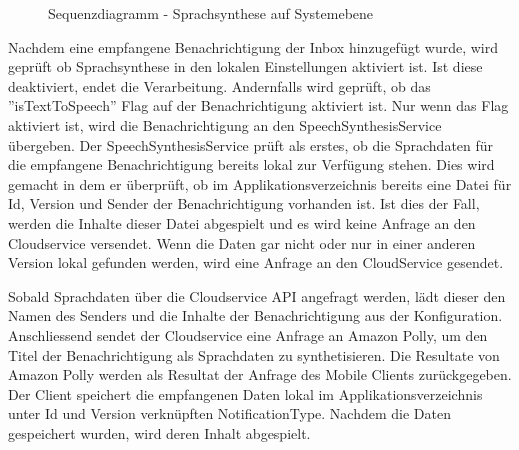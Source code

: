 \begin{figure}[h]
    \centering
    \begin{minipage}[b]{1\textwidth}
        \caption{Sequenzdiagramm - Sprachsynthese auf Systemebene}
    \end{minipage}
\end{figure}


Nachdem eine empfangene Benachrichtigung der Inbox hinzugefügt wurde, wird geprüft ob Sprachsynthese in den lokalen Einstellungen aktiviert ist.
Ist diese deaktiviert, endet die Verarbeitung.
Andernfalls wird geprüft, ob das ''isTextToSpeech'' Flag auf der Benachrichtigung aktiviert ist.
Nur wenn das Flag aktiviert ist, wird die Benachrichtigung an den SpeechSynthesisService übergeben.
Der SpeechSynthesisService prüft als erstes, ob die Sprachdaten für die empfangene Benachrichtigung bereits lokal zur Verfügung stehen.
Dies wird gemacht in dem er überprüft, ob im Applikationsverzeichnis bereits eine Datei für Id, Version und Sender der Benachrichtigung vorhanden ist.
Ist dies der Fall, werden die Inhalte dieser Datei abgespielt und es wird keine Anfrage an den Cloudservice versendet.
Wenn die Daten gar nicht oder nur in einer anderen Version lokal gefunden werden, wird eine Anfrage an den CloudService gesendet.

Sobald Sprachdaten über die Cloudservice API angefragt werden, lädt dieser den Namen des Senders und die Inhalte der Benachrichtigung aus der Konfiguration.
Anschliessend sendet der Cloudservice eine Anfrage an Amazon Polly, um den Titel der Benachrichtigung als Sprachdaten zu synthetisieren.
Die Resultate von Amazon Polly werden als Resultat der Anfrage des Mobile Clients zurückgegeben.
Der Client speichert die empfangenen Daten lokal im Applikationsverzeichnis unter Id und Version verknüpften NotificationType.
Nachdem die Daten gespeichert wurden, wird deren Inhalt abgespielt.

\clearpage
